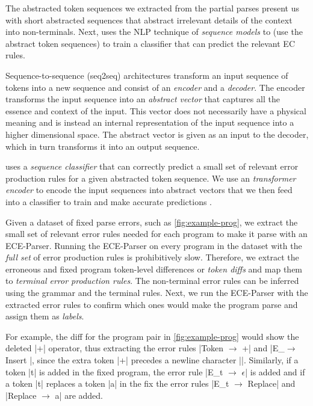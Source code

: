 The abstracted token sequences we extracted from
the partial parses present us with short abstracted
sequences that abstract irrelevant details of the context
into non-terminals.
%
Next, \toolname uses the NLP technique of
\emph{sequence models} \citep{Sutskever_2014, Hardalov_2018}
to (use the abstract token sequences) to train
a classifier that can predict the relevant EC rules.

%
Sequence-to-sequence (seq2seq) architectures
transform an input sequence of tokens into a
new sequence \citep{Sutskever_2014} and consist
of an \emph{encoder} and a \emph{decoder}.
%
The encoder transforms the input sequence into an \emph{abstract vector} that
captures all the essence and context of the input.
%
This vector does not necessarily have a physical
meaning and is instead an internal representation
of the input sequence into a higher dimensional space.
The abstract vector is given as an input to the decoder,
which in turn transforms it into an output sequence.


\toolname uses a \emph{sequence classifier} that can correctly predict a small
set of relevant error production rules for a given abstracted token sequence. We
use an \emph{transformer encoder} \citep{Vaswani_2017} to encode the input
sequences into abstract vectors that we then feed into a \emph{\dnn} classifier
to train and make accurate predictions \citep{Schmidhuber_2015}.

%
Given a dataset of fixed parse errors,
such as \autoref{fig:example-prog}, we
extract the small set of relevant error
rules needed for each program to make it parse
with an ECE-Parser.
%
Running the ECE-Parser on every program
in the dataset with the \emph{full set}
of error production rules is prohibitively
slow.
%
Therefore, we extract the erroneous and
fixed program token-level differences or
\emph{token diffs} and map them to
\emph{terminal error production rules}.
%
The non-terminal error rules can be
inferred using the grammar and the terminal
rules. Next, we run the ECE-Parser with
the extracted error rules to confirm which
ones would make the program parse and assign them as
\emph{labels}.

For example, the diff for the program pair in
\autoref{fig:example-prog} would show the
deleted |+| operator, thus extracting
the error rules |Token $\rightarrow$ +|
and |E_\n $\rightarrow$ Insert \n|,
since the extra token |+| precedes
a newline character |\n|.
%
Similarly, if a token |t| is added in
the fixed program, the error rule
%
|E_t $\rightarrow$ $\epsilon$| is
added and if a token |t| replaces
a token |a| in the fix the error
rules |E_t $\rightarrow$ Replace| and
%
|Replace $\rightarrow$ a| are added.

